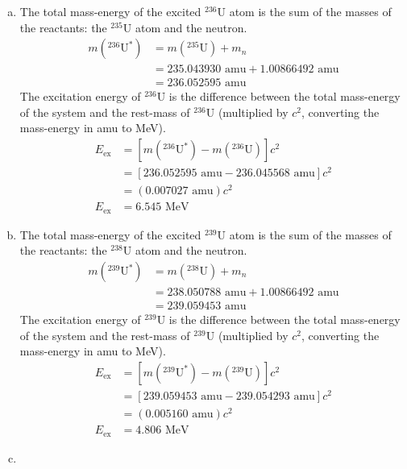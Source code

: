 \documentclass{report}
\begin{document}
\begin{enumerate}[a)]

\item 

The total mass-energy of the excited $^{236}$U atom is the sum of the masses of the reactants: the $^{235}$U atom and the neutron.
\begin{align*}
m(^{236}\text{U}^*)	&= m(^{235}\text{U}) + m_n \\
					&= 235.043930\text{ amu} + 1.00866492\text{ amu} \\
					&= 236.052595\text{ amu}
\end{align*}
The excitation energy of $^{236}$U is the difference between the total mass-energy of the system and the rest-mass of $^{236}$U (multiplied by $c^2$, converting the mass-energy in amu to MeV).
\begin{align*}
E_{\text{ex}}	&= \left[m(^{236}\text{U}^*) - m(^{236}\text{U})\right]c^2 \\
				&= \left[236.052595\text{ amu} - 236.045568\text{ amu}\right]c^2 \\
				&= (0.007027\text{ amu})c^2 \\
E_{\text{ex}}	&= 6.545\text{ MeV} 
\end{align*}


\item

The total mass-energy of the excited $^{239}$U atom is the sum of the masses of the reactants: the $^{238}$U atom and the neutron.
\begin{align*}
m(^{239}\text{U}^*)	&= m(^{238}\text{U}) + m_n \\
					&= 238.050788\text{ amu} + 1.00866492\text{ amu} \\
					&= 239.059453\text{ amu}
\end{align*}
The excitation energy of $^{239}$U is the difference between the total mass-energy of the system and the rest-mass of $^{239}$U (multiplied by $c^2$, converting the mass-energy in amu to MeV).
\begin{align*}
E_{\text{ex}}	&= \left[m(^{239}\text{U}^*) - m(^{239}\text{U})\right]c^2 \\
				&= \left[239.059453\text{ amu} - 239.054293\text{ amu}\right]c^2 \\
				&= (0.005160\text{ amu})c^2 \\
E_{\text{ex}}	&= 4.806\text{ MeV} 
\end{align*}


\item


\end{enumerate}
\end{document}
